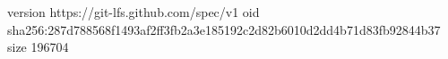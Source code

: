 version https://git-lfs.github.com/spec/v1
oid sha256:287d788568f1493af2ff3fb2a3e185192c2d82b6010d2dd4b71d83fb92844b37
size 196704

